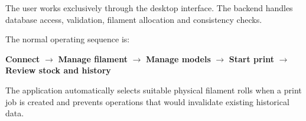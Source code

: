 \documentclass[a4paper,11pt]{article}
\begin{document}
The user works exclusively through the desktop interface. The backend handles
database access, validation, filament allocation and consistency checks.

The normal operating sequence is:

\begin{center}
\textbf{Connect}
$\rightarrow$
\textbf{Manage filament}
$\rightarrow$
\textbf{Manage models}
$\rightarrow$
\textbf{Start print}
$\rightarrow$
\textbf{Review stock and history}
\end{center}

The application automatically selects suitable physical filament rolls when
a print job is created and prevents operations that would invalidate existing
historical data.
\end{document}
